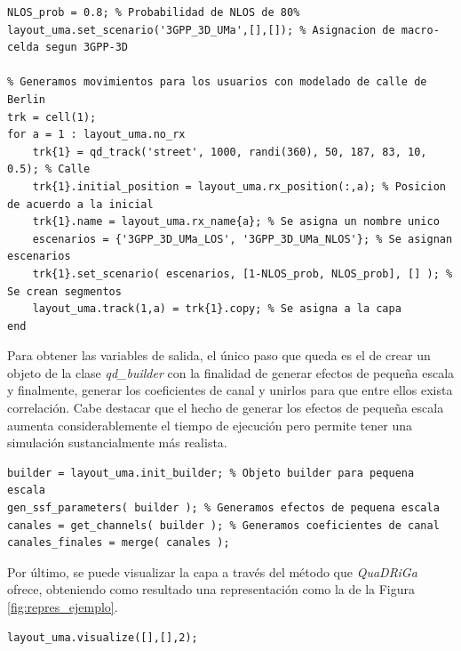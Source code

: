 \begin{lstlisting}[style=Matlab-editor, basicstyle=\tiny]
%% Modelado del escenario
NLOS_prob = 0.8; % Probabilidad de NLOS de 80%
layout_uma.set_scenario('3GPP_3D_UMa',[],[]); % Asignacion de macro-celda segun 3GPP-3D

% Generamos movimientos para los usuarios con modelado de calle de Berlin
trk = cell(1);
for a = 1 : layout_uma.no_rx
    trk{1} = qd_track('street', 1000, randi(360), 50, 187, 83, 10, 0.5); % Calle
    trk{1}.initial_position = layout_uma.rx_position(:,a); % Posicion de acuerdo a la inicial
    trk{1}.name = layout_uma.rx_name{a}; % Se asigna un nombre unico
    escenarios = {'3GPP_3D_UMa_LOS', '3GPP_3D_UMa_NLOS'}; % Se asignan escenarios
    trk{1}.set_scenario( escenarios, [1-NLOS_prob, NLOS_prob], [] ); % Se crean segmentos
    layout_uma.track(1,a) = trk{1}.copy; % Se asigna a la capa
end

\end{lstlisting}

Para obtener las variables de salida, el único paso que queda es el de crear un objeto de la clase \textit{qd\_builder} con la finalidad de generar efectos de pequeña escala y finalmente, generar los coeficientes de canal y unirlos para que entre ellos exista correlación. Cabe destacar que el hecho de generar los efectos de pequeña escala aumenta considerablemente el tiempo de ejecución pero permite tener una simulación sustancialmente más realista.

\begin{lstlisting}[style=Matlab-editor, basicstyle=\tiny]
%% Generamos canales
builder = layout_uma.init_builder; % Objeto builder para pequena escala
gen_ssf_parameters( builder ); % Generamos efectos de pequena escala
canales = get_channels( builder ); % Generamos coeficientes de canal
canales_finales = merge( canales );
\end{lstlisting}

Por último, se puede visualizar la capa a través del método que \textit{QuaDRiGa} ofrece, obteniendo como resultado una representación como la de la Figura \ref{fig:repres_ejemplo}.

\begin{lstlisting}[style=Matlab-editor, basicstyle=\tiny]
%% Visualizacion
layout_uma.visualize([],[],2);
\end{lstlisting}

